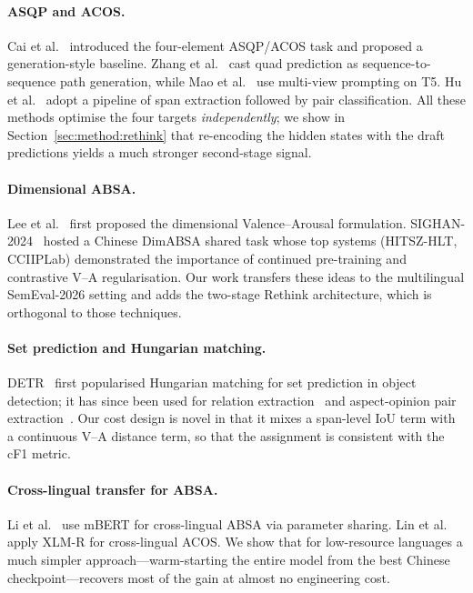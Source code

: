 \documentclass[runningheads]{llncs}
\begin{document}
\paragraph{ASQP and ACOS.}
Cai et al.~\cite{cai2021acos} introduced the four-element ASQP/ACOS
task and proposed a generation-style baseline.
Zhang et al.~\cite{zhang2021seq2path} cast quad prediction as
sequence-to-sequence path generation, while
Mao et al.~\cite{mao2022mvp} use multi-view prompting on T5.
Hu et al.~\cite{hu2022extractthenpredict} adopt a pipeline of span
extraction followed by pair classification.
All these methods optimise the four targets \emph{independently}; we
show in Section~\ref{sec:method:rethink} that re-encoding the hidden
states with the draft predictions yields a much stronger second-stage
signal.

\paragraph{Dimensional ABSA.}
Lee et al.~\cite{lee2022dimabsa} first proposed the dimensional
Valence--Arousal formulation. SIGHAN-2024~\cite{sighan2024dimabsa}
hosted a Chinese DimABSA shared task whose top systems
(HITSZ-HLT, CCIIPLab) demonstrated the importance of continued
pre-training and contrastive V--A regularisation. Our work transfers
these ideas to the multilingual SemEval-2026 setting and adds the
two-stage Rethink architecture, which is orthogonal to those
techniques.

\paragraph{Set prediction and Hungarian matching.}
DETR~\cite{carion2020detr} first popularised Hungarian matching for
set prediction in object detection; it has since been used for
relation extraction~\cite{tan2022rete} and aspect-opinion pair
extraction~\cite{chen2022spaopn}. Our cost design is novel in that it
mixes a span-level IoU term with a continuous V--A distance term, so
that the assignment is consistent with the cF1 metric.

\paragraph{Cross-lingual transfer for ABSA.}
Li et al.~\cite{li2020xabsa} use mBERT for cross-lingual ABSA via
parameter sharing.
Lin et al.~\cite{lin2023xacos} apply XLM-R for cross-lingual ACOS.
We show that for low-resource languages a much simpler
approach---warm-starting the entire model from the best Chinese
checkpoint---recovers most of the gain at almost no engineering cost.
\end{document}
